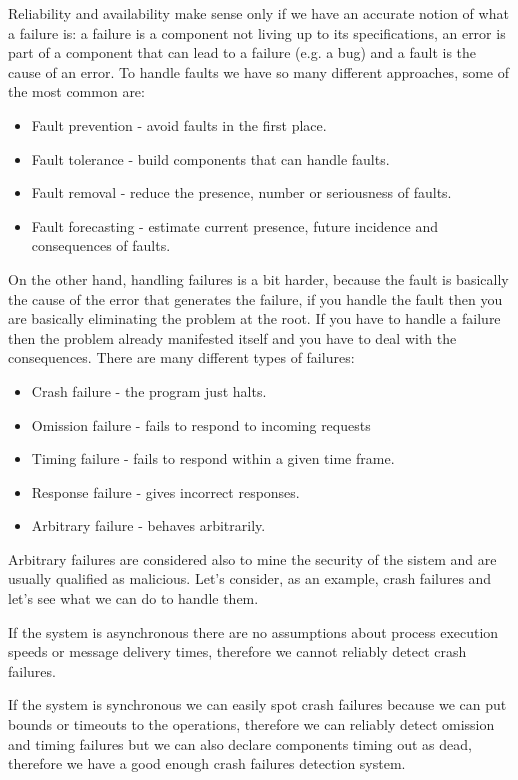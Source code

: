 Reliability and availability make sense only if we have an accurate notion of what a failure is: a failure is a component not living up to its specifications, an error is part of a component that can lead to a failure (e.g. a bug) and a fault is the cause of an error. To handle faults we have so many different approaches, some of the most common are:
\begin{itemize}
    \item Fault prevention - avoid faults in the first place.
    \item Fault tolerance - build components that can handle faults.
    \item Fault removal - reduce the presence, number or seriousness of faults.
    \item Fault forecasting - estimate current presence, future incidence and consequences of faults.
\end{itemize}
On the other hand, handling failures is a bit harder, because the fault is basically the cause of the error that generates the failure, if you handle the fault then you are basically eliminating the problem at the root. If you have to handle a failure then the problem already manifested itself and you have to deal with the consequences. There are many different types of failures:
\begin{itemize}
    \item Crash failure - the program just halts.
    \item Omission failure - fails to respond to incoming requests
    \item Timing failure - fails to respond within a given time frame.
    \item Response failure - gives incorrect responses.
    \item Arbitrary failure - behaves arbitrarily.
\end{itemize}
Arbitrary failures are considered also to mine the security of the sistem and are usually qualified as malicious. Let's consider, as an example, crash failures and let's see what we can do to handle them.

If the system is asynchronous there are no assumptions about process execution speeds or message delivery times, therefore we cannot reliably detect crash failures.

If the system is synchronous we can easily spot crash failures because we can put bounds or timeouts to the operations, therefore we can reliably detect omission and timing failures but we can also declare components timing out as dead, therefore we have a good enough crash failures detection system.


